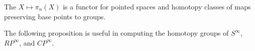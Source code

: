 The $X \mapsto \pi_n(X)$ is a functor for pointed spaces and homotopy classes of maps preserving base points to groups.

The following proposition is useful in computing the homotopy groups of $S^\infty$, $RP^\infty$, and $CP^\infty$.
